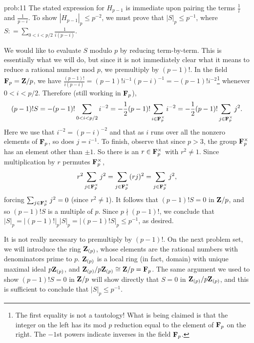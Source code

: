 \begin{sol}{prob:11} The stated expression for $H_{p-1}$ is immediate upon pairing the terms $\frac{1}{i}$ and $\frac{1}{p-i}$. To show $|H_{p-1}|_{p} \le p^{-2}$, we must prove that $|S|_{p} \le p^{-1}$, where $S: = \sum_{0 < i < p/2} \frac{1}{i(p-i)}$. 

We would like to evaluate $S$ modulo $p$ by reducing term-by-term. This is essentially what we will do, but since it is not immediately clear what it means to reduce a rational number mod $p$, we premultiply by $(p-1)!$. In the field $\mathbf{F}_p=\mathbf{Z}/p$, we have $\frac{(p-1)!}{i(p-i)} = (p-1)!i^{-1} (p-i)^{-1} = -(p-1)! i^{-2}$\footnote{The first equality is not  a tautology! What is being claimed is that the integer on the left has its mod $p$ reduction equal to the element of $\mathbf{F}_p$ on the right. The $-1$st powers indicate inverses in the field $\mathbf{F}_p$.} whenever $0 < i < p/2$.  Therefore (still working in $\mathbf{F}_p$),
\[ (p-1)!S = -(p-1)! \sum_{0 < i < p/2} i^{-2} = -\frac{1}{2}(p-1)! \sum_{i \in \mathbf{F}_p^{\times}} i^{-2} = -\frac{1}{2}(p-1)! \sum_{j \in \mathbf{F}_p^{\times}} j^{2}. \]
Here we use that $i^{-2} = (p-i)^{-2}$ and that as $i$ runs over all the nonzero elements of $\mathbf{F}_p$, so does $j = i^{-1}$. To finish, observe that since $p > 3$, the group $\mathbf{F}_p^{\times}$ has an element other than $\pm 1$. So there is an $r \in \mathbf{F}_p^{\times}$ with $r^2\ne 1$. Since multiplication by $r$ permutes $\mathbf{F}_p^{\times}$,
\[ r^2 \sum_{j \in \mathbf{F}_p^{\times}} j^{2} = \sum_{j \in \mathbf{F}_p^{\times}} (rj)^{2} = \sum_{j \in \mathbf{F}_p^{\times}} j^{2}, \]
forcing $\sum_{j \in \mathbf{F}_p^{\times}} j^2=0$ (since $r^2\ne 1$). It follows that $(p-1)!S=0$ in $\mathbf{Z}/p$, and so $(p-1)!S$ is a multiple of $p$. Since $p\nmid (p-1)!$, we conclude that $|S|_p = |(p-1)!|_p |S|_p = |(p-1)! S|_p \le p^{-1}$, as desired.

\begin{rmk} It is not really necessary to premultiply by $(p-1)!$. On the next problem set, we will introduce the ring $\mathbf{Z}_{(p)}$, whose elements are the rational numbers with denominators prime to $p$. $\mathbf{Z}_{(p)}$ is a local ring (in fact, domain) with unique maximal ideal $p\mathbf{Z}_{(p)}$, and $\mathbf{Z}_{(p)}/p\mathbf{Z}_{(p)} \cong \mathbf{Z}/p = \mathbf{F}_p$. The same argument we used to show $(p-1)!S=0$ in $\mathbf{Z}/p$ will show directly that $S = 0$ in $\mathbf{Z}_{(p)}/p\mathbf{Z}_{(p)}$, and this is sufficient to conclude that $|S|_p \le p^{-1}$.  
\end{rmk}
\end{sol}




